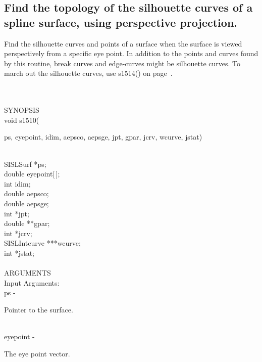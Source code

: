 \subsection{Find the topology of the silhouette curves of a spline surface,
 using perspective projection.}
\begin{minipg1}
  Find the silhouette curves and points of a surface when
  the surface is viewed perspectively from a specific eye point.
  In addition to the points and curves found by this routine,
  break curves and edge-curves might be silhouette curves.
  To march out the silhouette curves, use s1514() on page~\pageref{s1514}.
\end{minipg1} \\ \\
SYNOPSIS\\
        \>void s1510(\begin{minipg3}
          {\fov ps}, {\fov eyepoint}, {\fov idim},  {\fov aepsco},  {\fov aepsge},  {\fov jpt},  {\fov gpar},  {\fov jcrv},  {\fov wcurve},  {\fov jstat})
        \end{minipg3}\\[0.3ex]
        \>\>    SISLSurf \> *{\fov ps};\\
        \>\>    double   \> {\fov eyepoint}[\,];\\
        \>\>    int      \> {\fov idim};\\
        \>\>    double   \> {\fov aepsco};\\
        \>\>    double   \> {\fov aepsge};\\
        \>\>    int      \> *{\fov jpt};\\
        \>\>    double   \> **{\fov gpar};\\
        \>\>    int      \> *{\fov jcrv};\\
        \>\>    SISLIntcurve \> ***{\fov wcurve};\\
        \>\>    int      \> *{\fov jstat};\\
\\
ARGUMENTS\\
        \>Input Arguments:\\
        \>\>    {\fov ps}\> - \>  \begin{minipg2}
                           Pointer to the surface.
                               \end{minipg2}\\
        \>\>    {\fov eyepoint}\> - \>  \begin{minipg2}
                      The eye point vector.
                               \end{minipg2}\\
